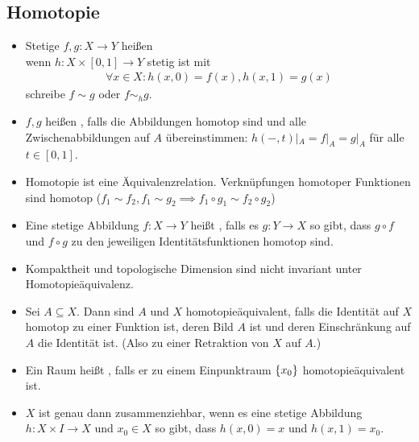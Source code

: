 \documentclass[8pt]{extarticle}
\begin{document}
\subsection*{Homotopie}
\begin{itemize}
	\item Stetige $f,g : X \to Y$ heißen \\ wenn $h : X \times [0,1] \to Y$ stetig ist mit
	\begin{align*}
		\forall x \in X:
		h(x,0) = f(x),
		h(x,1) = g(x)
	\end{align*}
	schreibe $f \sim g$ oder $f \sim_h g$.
	\item $f,g$ heißen , falls die Abbildungen homotop sind und alle Zwischenabbildungen auf $A$ übereinstimmen: $h(-,t)|_A = f|_A = g|_A$ für alle $t \in [0,1]$.
	\item Homotopie ist eine Äquivalenzrelation. Verknüpfungen homotoper Funktionen sind homotop ($f_1 \sim f_2, f_1 \sim g_2 \implies f_1 \circ g_1 \sim f_2 \circ g_2$)
	\item Eine stetige Abbildung $f : X \to Y$ heißt , falls es $g : Y \to X$ so gibt, dass $g \circ f$ und $f \circ g$ zu den jeweiligen Identitätsfunktionen homotop sind.
	\item Kompaktheit und topologische Dimension sind nicht invariant unter Homotopieäquivalenz.
	\item Sei $A \subseteq X$. Dann sind $A$ und $X$ homotopieäquivalent, falls die Identität auf $X$ homotop zu einer Funktion ist, deren Bild $A$ ist und deren Einschränkung auf $A$ die Identität ist. (Also zu einer Retraktion von $X$ auf $A$.)
	\item Ein Raum heißt , falls er zu einem Einpunktraum $\qty{x_0}$ homotopieäquivalent ist.
	\item $X$ ist genau dann zusammenziehbar, wenn es eine stetige Abbildung $h : X \times I \to X$ und $x_0 \in X$ so gibt, dass $h(x,0) = x$ und $h(x,1) = x_0$.
\end{itemize}
\end{document}
